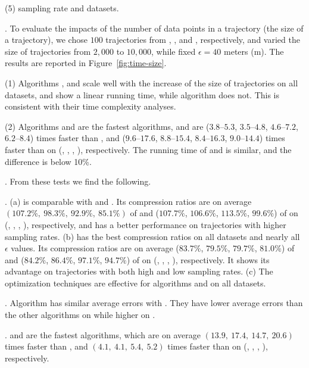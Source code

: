 \sstab (5) sampling rate and datasets.







.
To evaluate the impacts of the number of data points in a trajectory (\ie the size of a trajectory),
we chose $100$ trajectories from \taxi, \truck, \ucar and \geolife, respectively,
and varied the size  of trajectories from $2,000$ to $10,000$, while fixed $\epsilon = 40$ meters (m).
The results are reported in Figure~\ref{fig:time-size}.

\sstab(1) Algorithms \operb, \operba and \fbqsa  scale well with the increase of the size of trajectories on all datasets,
and show a linear running time, while algorithm \dpa does not.
This is consistent with their time complexity analyses.

\sstab(2) Algorithms \operb and \operba are the fastest \lsa algorithms, and are {($3.8$--$5.3$, $3.5$--$4.8$, $4.6$--$7.2$, $6.2$--$8.4$)} times faster than \fbqsa,
and {($9.6$--$17.6$, $8.8$--$15.4$, $8.4$--$16.3$, $9.0$--$14.4$)} times faster than \dpa on (\taxi, \truck, \ucar, \geolife), respectively. The running time of \operb and \operba is similar, and the difference is below 10\%.

.
From these tests we find the following.

\emph{}. (a) \operb is comparable {with \fbqsa and \dpa}. Its compression ratios are on average $(107.2\%, ~98.3\%, ~92.9\%, ~85.1\%)$ of \fbqsa and ($107.7\%$, $106.6\%$, $113.5\%$, $99.6\%$) of \dpa on (\taxi, \truck, \ucar, \geolife), respectively, and \operb has a better performance on trajectories with higher sampling rates.
(b) \operba has the best compression ratios on all datasets and nearly all $\epsilon$ values.
Its compression ratios are on average {($83.7\%$, $79.5\%$, $79.7\%$, $81.0\%$)} of \fbqsa and {($84.2\%$, $86.4\%$, $97.1\%$, $94.7\%$)} of \dpa on (\taxi, \truck, \ucar, \geolife), respectively.
It shows its advantage on trajectories with both high and low sampling rates.
(c) The optimization techniques are effective for algorithms \operb and \operba on all datasets.

\emph{}. {Algorithm \operb has similar average errors with \operba. They have lower average errors than the other algorithms on \taxi while higher on \ucar.}


\emph{}. \operb and \operba are the fastest algorithms, which are on average $(13.9, ~17.4, ~14.7, {~20.6})$ times faster than \dpa, and $(4.1,~4.1,~5.4, {~5.2})$
times faster than \fbqsa on (\taxi, \truck, \ucar, \geolife), respectively.




